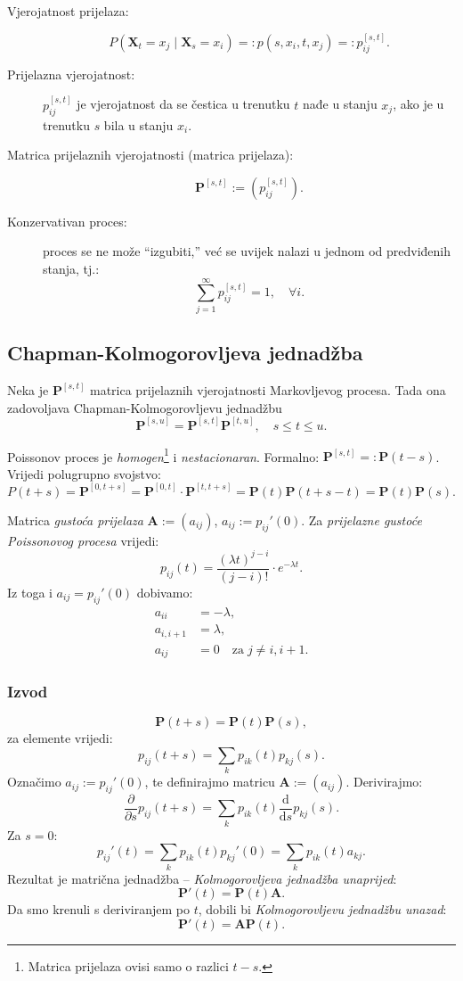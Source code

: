 \documentclass[12pt,english]{article}
\newcommand{\X}{\mathbf X}
\newcommand{\A}{\mathbf A}
\newcommand{\MP}{\mathbf P}
\newcommand{\vertS}{\; \vert \;}
\begin{document}
\begin{description}
  \item[Vjerojatnost prijelaza:]
  $$P(\X_t=x_j \vertS \X_s = x_i)=: p(s,x_i,t,x_j) =: p_{ij}^{[s,t]}.$$
  \item[Prijelazna vjerojatnost:] $p_{ij}^{[s,t]}$ je vjerojatnost da se čestica u trenutku $t$ nađe u stanju $x_j$, ako je u trenutku $s$ bila u stanju $x_i$.
  \item[Matrica prijelaznih vjerojatnosti (matrica prijelaza):]
  $$\MP^{[s,t]} := \left(p_{ij}^{[s,t]}\right).$$
  \item[Konzervativan proces:] proces se ne može ``izgubiti,'' već se uvijek nalazi u jednom od predviđenih stanja, tj.:
  $$\sum\limits_{j=1}^\infty p_{ij}^{[s,t]} = 1, \quad \forall i.$$
\end{description}

\subsection{Chapman-Kolmogorovljeva jednadžba}
Neka je $\MP^{[s,t]}$ matrica prijelaznih vjerojatnosti Markovljevog procesa. Tada ona zadovoljava Chapman-Kolmogorovljevu jednadžbu
$$\MP^{[s,u]} = \MP^{[s,t]}\MP^{[t,u]},\quad s \leq t \leq u.$$

\noindent Poissonov proces je \emph{homogen}\footnote{Matrica prijelaza ovisi samo o razlici $t-s$.} i \emph{nestacionaran}. Formalno: $\MP^{[s,t]} =: \MP(t-s)$. Vrijedi polugrupno svojstvo:
$$P(t+s) = \MP^{[0,t+s]}=\MP^{[0,t]}\cdot \MP^{[t,t+s]}=\MP(t)\MP(t+s-t)=\MP(t)\MP(s).$$

\noindent Matrica \emph{gustoća prijelaza} $\A := (a_{ij})$, $a_{ij}:=p_{ij}'(0)$. Za \emph{prijelazne gustoće Poissonovog procesa} vrijedi:
$$p_{ij}(t)=\frac{(\lambda t)^{j-i}}{(j-i)!}\cdot e^{-\lambda t}.$$
Iz toga i $a_{ij} = p_{ij}'(0)$ dobivamo:
\begin{align}
a_{ii} &= -\lambda, \nonumber \\
a_{i,i+1} &= \lambda, \nonumber \\
a_{ij} &= 0\quad \text{za}\; j\neq i, i+1. \nonumber
\end{align}


\subsubsection{Izvod}
$$\MP(t+s)=\MP(t)\MP(s),$$
za elemente vrijedi:
$$p_{ij}(t+s) = \sum\limits_k p_{ik}(t)p_{kj}(s).$$
Označimo $a_{ij}:=p_{ij}'(0)$, te definirajmo matricu $\A := (a_{ij})$. Derivirajmo:
$$\frac{\partial}{\partial s}p_{ij}(t+s) = \sum\limits_k p_{ik}(t)\frac{\mathrm d}{\mathrm ds}p_{kj}(s).$$
Za $s=0$:
$$p_{ij}'(t)=\sum\limits_k p_{ik}(t)p_{kj}'(0)=\sum\limits_k p_{ik}(t)a_{kj}.$$
Rezultat je matrična jednadžba -- \emph{Kolmogorovljeva jednadžba unaprijed}:
$$\MP'(t)=\MP(t)\A.$$
Da smo krenuli s deriviranjem po $t$, dobili bi \emph{Kolmogorovljevu jednadžbu unazad}:
$$\MP'(t)=\A\MP(t).$$
\end{document}
